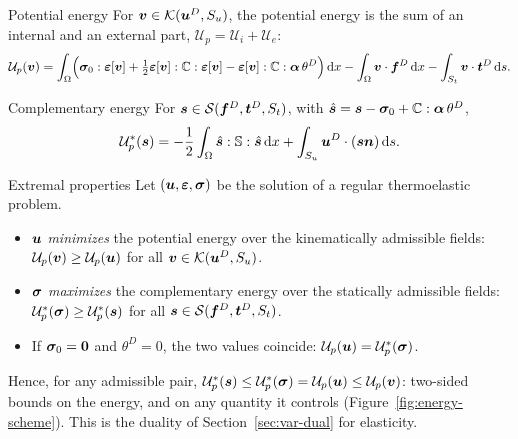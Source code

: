 \begin{gbox}{Potential energy}
For $\bm{v}\in\mathcal{K}(\bm{u}^{D},S_u)$, the potential energy is the sum of an internal
and an external part, $\mathcal U_p=\mathcal U_i+\mathcal U_e$:
\begin{equation}\label{eq:Up}
  \mathcal U_p(\bm{v})=\int_\Omega\Bigl(\bm{\sigma}_0:\bm{\varepsilon}[\bm{v}]+\tfrac12\bm{\varepsilon}[\bm{v}]:\mathbb{C}:\bm{\varepsilon}[\bm{v}]
  -\bm{\varepsilon}[\bm{v}]:\mathbb{C}:\bm{\alpha}\,\theta^D\Bigr)\,\mathrm{d} x
  -\int_\Omega\bm{v}\cdot\bm{f}^{D}\,\mathrm{d} x-\int_{S_t}\bm{v}\cdot\bm{t}^{D}\,\mathrm{d} s .
\end{equation}
\end{gbox}

\begin{gbox}{Complementary energy}
For $\bm{s}\in\mathcal{S}(\bm{f}^{D},\bm{t}^{D},S_t)$, with
$\hat{\bm{s}}=\bm{s}-\bm{\sigma}_0+\mathbb{C}:\bm{\alpha}\,\theta^D$,
\begin{equation}\label{eq:Uc}
  \mathcal U_p^\ast(\bm{s})=-\frac12\int_\Omega\hat{\bm{s}}:\mathbb{S}:\hat{\bm{s}}\,\mathrm{d} x
  +\int_{S_u}\bm{u}^{D}\cdot(\bm{s}\bm{n})\,\mathrm{d} s .
\end{equation}
\end{gbox}

\begin{gbox}{Extremal properties}
%
Let $(\bm{u},\bm{\varepsilon},\bm{\sigma})$ be the solution of a regular thermoelastic problem.
\begin{itemize}
\item $\bm{u}$ \emph{minimizes} the potential energy over the kinematically
admissible fields: $\mathcal U_p(\bm{v})\ge\mathcal U_p(\bm{u})$ for all
$\bm{v}\in\mathcal{K}(\bm{u}^{D},S_u)$.
\item $\bm{\sigma}$ \emph{maximizes} the complementary energy over the statically
admissible fields: $\mathcal U_p^\ast(\bm{\sigma})\ge\mathcal U_p^\ast(\bm{s})$ for
all $\bm{s}\in\mathcal{S}(\bm{f}^{D},\bm{t}^{D},S_t)$.
\item If $\bm{\sigma}_0=\bm{0}$ and $\theta^D=0$, the two values coincide:
$\mathcal U_p(\bm{u})=\mathcal U_p^\ast(\bm{\sigma})$.
\end{itemize}
\end{gbox}
Hence, for any admissible pair,
$\mathcal U_p^\ast(\bm{s})\le\mathcal U_p^\ast(\bm{\sigma})=\mathcal U_p(\bm{u})\le\mathcal U_p(\bm{v})$:
two-sided bounds on the energy, and on any quantity it controls
(Figure~\ref{fig:energy-scheme}). This is the duality of
Section~\ref{sec:var-dual} for elasticity.

